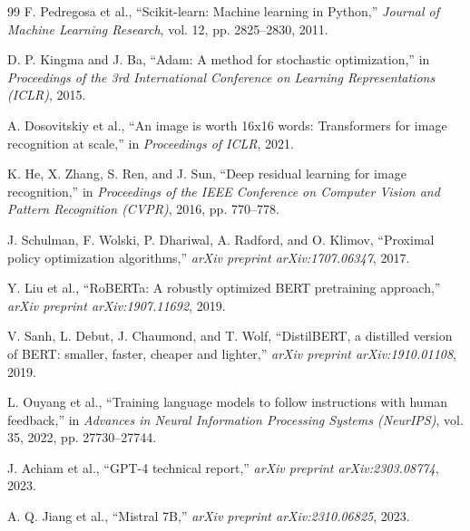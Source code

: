 \begin{thebibliography}{99}
F. Pedregosa et al., ``Scikit-learn: Machine learning in Python,'' \textit{Journal of Machine Learning Research}, vol. 12, pp. 2825--2830, 2011.

D. P. Kingma and J. Ba, ``Adam: A method for stochastic optimization,'' in \textit{Proceedings of the 3rd International Conference on Learning Representations (ICLR)}, 2015.

A. Dosovitskiy et al., ``An image is worth 16x16 words: Transformers for image recognition at scale,'' in \textit{Proceedings of ICLR}, 2021.

K. He, X. Zhang, S. Ren, and J. Sun, ``Deep residual learning for image recognition,'' in \textit{Proceedings of the IEEE Conference on Computer Vision and Pattern Recognition (CVPR)}, 2016, pp. 770--778.

J. Schulman, F. Wolski, P. Dhariwal, A. Radford, and O. Klimov, ``Proximal policy optimization algorithms,'' \textit{arXiv preprint arXiv:1707.06347}, 2017.

Y. Liu et al., ``RoBERTa: A robustly optimized BERT pretraining approach,'' \textit{arXiv preprint arXiv:1907.11692}, 2019.

V. Sanh, L. Debut, J. Chaumond, and T. Wolf, ``DistilBERT, a distilled version of BERT: smaller, faster, cheaper and lighter,'' \textit{arXiv preprint arXiv:1910.01108}, 2019.

L. Ouyang et al., ``Training language models to follow instructions with human feedback,'' in \textit{Advances in Neural Information Processing Systems (NeurIPS)}, vol. 35, 2022, pp. 27730--27744.

J. Achiam et al., ``GPT-4 technical report,'' \textit{arXiv preprint arXiv:2303.08774}, 2023.

A. Q. Jiang et al., ``Mistral 7B,'' \textit{arXiv preprint arXiv:2310.06825}, 2023.

\end{thebibliography}
